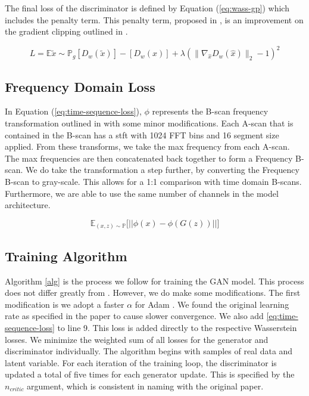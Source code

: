 The final loss of the discriminator is defined by Equation (\ref{eq:wass-gp}) which includes the penalty term. This penalty term, proposed in \cite{WGAN-GP}, is an improvement on the gradient clipping outlined in \cite{WGAN}.

\begin{equation}
\label{eq:wass-gp}
    L = \mathbb{E} {\tilde{x} \sim \mathbb{P}_g} [D_{w}(\tilde{x})] - [D_{w}(x)] + \lambda(\|{\nabla_{\hat{x}} D_{w}(\hat{x})}\|_{2} - 1)^2
\end{equation}



\subsection{Frequency Domain Loss}
In Equation (\ref{eq:time-sequence-loss}), $\phi$ represents the B-scan frequency transformation outlined in \cite{ZHANG-2017} with some minor modifications. Each A-scan that is contained in the B-scan has a \acrfull{stft} \cite{stft} with 1024 FFT bins and 16 segment size applied. From these transforms, we take the max frequency from each A-scan. The max frequencies are then concatenated back together to form a Frequency B-scan. We do take the transformation a step further, by converting the Frequency B-scan to gray-scale. This allows for a 1:1 comparison with time domain B-scans. Furthermore, we are able to use the same number of channels in the model architecture.

\begin{equation}
\label{eq:time-sequence-loss}
    \mathbb{E}_{(x, z) \sim \mathbb{P}}\Big[ \big|\big| \phi(x) - \phi(G(z)) \big|\big| \Big]
\end{equation}

\subsection{Training Algorithm}
Algorithm \ref{alg} is the process we follow for training the GAN model. This process does not differ greatly from \cite{WGAN-GP}. However, we do make some modifications. The first modification is we adopt a faster $\alpha$ for Adam \cite{ADAM}. We found the original learning rate as specified in the paper to cause slower convergence. We also add \ref{eq:time-sequence-loss} to line 9. This loss is added directly to the respective Wasserstein losses. We minimize the weighted sum of all losses for the generator and discriminator individually. The algorithm begins with samples of real data and latent variable. For each iteration of the training loop, the discriminator is updated a total of five times for each generator update. This is specified by the $n_{critic}$ argument, which is consistent in naming with the original paper. 

